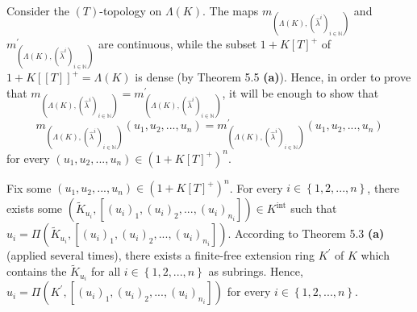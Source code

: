 \documentclass[numbers=enddot,12pt,final,onecolumn,notitlepage]{scrartcl}%
\begin{document}
Consider the $\left(  T\right)  $-topology on $\Lambda\left(  K\right)  $. The
maps $m_{\left(  \Lambda\left(  K\right)  ,\left(  \widehat{\lambda}%
^{i}\right)  _{i\in\mathbb{N}}\right)  }$ and $m_{\left(  \Lambda\left(
K\right)  ,\left(  \widehat{\lambda}^{i}\right)  _{i\in\mathbb{N}}\right)
}^{\prime}$ are continuous, while the subset $1+K\left[  T\right]  ^{+}$ of
$1+K\left[  \left[  T\right]  \right]  ^{+}=\Lambda\left(  K\right)  $ is
dense (by Theorem 5.5 \textbf{(a)}). Hence, in order to prove that $m_{\left(
\Lambda\left(  K\right)  ,\left(  \widehat{\lambda}^{i}\right)  _{i\in
\mathbb{N}}\right)  }=m_{\left(  \Lambda\left(  K\right)  ,\left(
\widehat{\lambda}^{i}\right)  _{i\in\mathbb{N}}\right)  }^{\prime}$, it will
be enough to show that
\begin{equation}
m_{\left(  \Lambda\left(  K\right)  ,\left(  \widehat{\lambda}^{i}\right)
_{i\in\mathbb{N}}\right)  }\left(  u_{1},u_{2},...,u_{n}\right)  =m_{\left(
\Lambda\left(  K\right)  ,\left(  \widehat{\lambda}^{i}\right)  _{i\in
\mathbb{N}}\right)  }^{\prime}\left(  u_{1},u_{2},...,u_{n}\right)
\label{8.4.goal}%
\end{equation}
for every $\left(  u_{1},u_{2},...,u_{n}\right)  \in\left(  1+K\left[
T\right]  ^{+}\right)  ^{n}.$

Fix some $\left(  u_{1},u_{2},...,u_{n}\right)  \in\left(  1+K\left[
T\right]  ^{+}\right)  ^{n}$. For every $i\in\left\{  1,2,...,n\right\}  $,
there exists some $\left(  \widetilde{K}_{u_{i}},\left[  \left(  u_{i}\right)
_{1},\left(  u_{i}\right)  _{2},...,\left(  u_{i}\right)  _{n_{i}}\right]
\right)  \in K^{\operatorname*{int}}$ such that $u_{i}=\Pi\left(
\widetilde{K}_{u_{i}},\left[  \left(  u_{i}\right)  _{1},\left(  u_{i}\right)
_{2},...,\left(  u_{i}\right)  _{n_{i}}\right]  \right)  $. According to
Theorem 5.3 \textbf{(a)} (applied several times), there exists a finite-free
extension ring $K^{\prime}$ of $K$ which contains the $\widetilde{K}_{u_{i}}$
for all $i\in\left\{  1,2,...,n\right\}  $ as subrings. Hence, $u_{i}%
=\Pi\left(  K^{\prime},\left[  \left(  u_{i}\right)  _{1},\left(
u_{i}\right)  _{2},...,\left(  u_{i}\right)  _{n_{i}}\right]  \right)  $ for
every $i\in\left\{  1,2,...,n\right\}  $.
\end{document}
